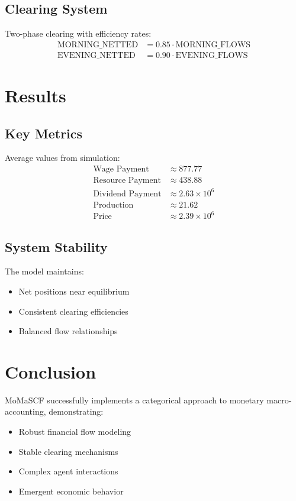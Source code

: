 \documentclass{article}
\begin{document}
\subsection{Clearing System}
Two-phase clearing with efficiency rates:
\begin{align*}
    \text{MORNING\_NETTED} &= 0.85 \cdot \text{MORNING\_FLOWS} \\
    \text{EVENING\_NETTED} &= 0.90 \cdot \text{EVENING\_FLOWS}
\end{align*}

\section{Results}

\subsection{Key Metrics}
Average values from simulation:
\begin{align*}
    \text{Wage Payment} &\approx 877.77 \\
    \text{Resource Payment} &\approx 438.88 \\
    \text{Dividend Payment} &\approx 2.63 \times 10^6 \\
    \text{Production} &\approx 21.62 \\
    \text{Price} &\approx 2.39 \times 10^6
\end{align*}

\subsection{System Stability}
The model maintains:
\begin{itemize}
    \item Net positions near equilibrium
    \item Consistent clearing efficiencies
    \item Balanced flow relationships
\end{itemize}

\section{Conclusion}

MoMaSCF successfully implements a categorical approach to monetary macro-accounting, demonstrating:
\begin{itemize}
    \item Robust financial flow modeling
    \item Stable clearing mechanisms
    \item Complex agent interactions
    \item Emergent economic behavior
\end{itemize}
\end{document}
